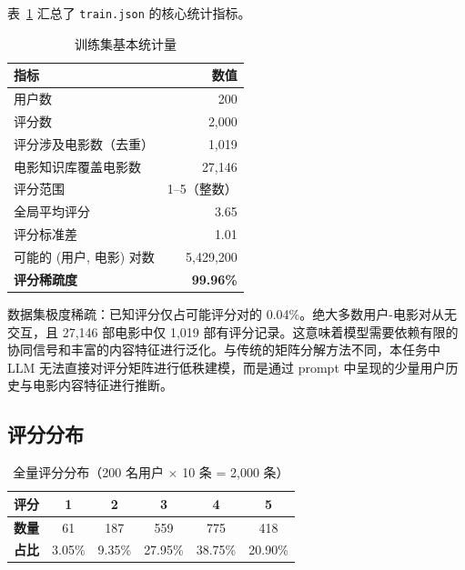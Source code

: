 \documentclass[UTF8,a4paper,10pt,fontset=none]{ctexart}
\begin{document}
表~\ref{tab:basic_stats} 汇总了 \texttt{train.json} 的核心统计指标。

\begin{table}[htbp]
    \centering
    \setlength{\tabcolsep}{32pt}
    \caption{训练集基本统计量}
    \label{tab:basic_stats}
    \begin{tabular}{@{}lr@{}}
        \toprule
        \textbf{指标} & \textbf{数值} \\
        \midrule
        用户数 & 200 \\
        评分数 & 2,000 \\
        评分涉及电影数（去重） & 1,019 \\
        电影知识库覆盖电影数 & 27,146 \\
        \midrule
        评分范围 & 1--5（整数） \\
        全局平均评分 & 3.65 \\
        评分标准差 & 1.01 \\
        可能的 (用户, 电影) 对数 & 5,429,200 \\
        \textbf{评分稀疏度} & \textbf{99.96\%} \\
        \bottomrule
    \end{tabular}
\end{table}

数据集极度稀疏：已知评分仅占可能评分对的 0.04\%。绝大多数用户-电影对从无交互，且 27,146 部电影中仅 1,019 部有评分记录。这意味着模型需要依赖有限的协同信号和丰富的内容特征进行泛化。与传统的矩阵分解方法不同，本任务中 LLM 无法直接对评分矩阵进行低秩建模，而是通过 prompt 中呈现的少量用户历史与电影内容特征进行推断。

\subsection{评分分布}

\begin{table}[htbp]
    \centering
    \setlength{\tabcolsep}{20pt}
    \caption{全量评分分布（200 名用户 $\times$ 10 条 = 2,000 条）}
    \label{tab:rating_dist}
    \begin{tabular}{@{}lccccc@{}}
        \toprule
        \textbf{评分} & 1 & 2 & 3 & 4 & 5 \\
        \midrule
        \textbf{数量} & 61 & 187 & 559 & 775 & 418 \\
        \textbf{占比} & 3.05\% & 9.35\% & 27.95\% & 38.75\% & 20.90\% \\
        \bottomrule
    \end{tabular}
\end{table}
\end{document}
